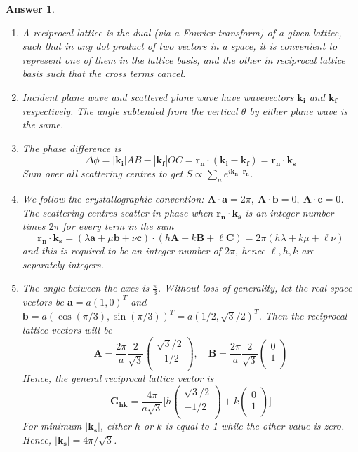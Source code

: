 \documentclass[a4paper]{article}
\newtheorem{ans}{Answer}[subsection]
\theoremstyle{new}
\begin{document}
\begin{ans}\leavevmode
\begin{enumerate}[label=(\roman*)]
\item A reciprocal lattice is the dual (via a Fourier transform) of a given lattice, such that in any dot product of two vectors in a space, it is convenient to represent one of them in the lattice basis, and the other in reciprocal lattice basis such that the cross terms cancel.
\item Incident plane wave and scattered plane wave have wavevectors $\mathbf{k_i}$ and $\mathbf{k_f}$ respectively. The angle subtended from the vertical $\theta$ by either plane wave is the same.
\item The phase difference is $$\Delta\phi=|\mathbf{k_i}|AB-|\mathbf{k_f}|OC=\mathbf{r_n}\cdot(\mathbf{k_i}-\mathbf{k_f})=\mathbf{r_n}\cdot\mathbf{k_s}$$
Sum over all scattering centres to get $S\propto \sum_ne^{i\mathbf{k_n}\cdot\mathbf{r_n}}$.
\item We follow the crystallographic convention: $\mathbf{A}\cdot\mathbf{a}=2\pi,~\mathbf{A}\cdot\mathbf{b}=0,~\mathbf{A}\cdot\mathbf{c}=0$. The scattering centres scatter in phase when $\mathbf{r_n}\cdot\mathbf{k_s}$ is an integer number times $2\pi$ for every term in the sum
$$\mathbf{r_n}\cdot\mathbf{k_s}=(\lambda\mathbf{a}+\mu\mathbf{b}+\nu\mathbf{c})\cdot(h\mathbf{A}+k\mathbf{B}+\ell\mathbf{C})=2\pi(h\lambda+k\mu+\ell\nu)$$
and this is required to be an integer number of $2\pi$, hence $\ell,h,k$ are separately integers.
\item The angle between the axes is $\frac{\pi}{3}$. Without loss of generality, let the real space vectors be $\mathbf{a}=a(1,0)^T$ and $\mathbf{b}=a(\cos(\pi/3),\sin(\pi/3))^T=a(1/2,\sqrt{3}/2)^T$. Then the reciprocal lattice vectors will be 
$$\mathbf{A}=\frac{2\pi}{a}\frac{2}{\sqrt{3}}\begin{pmatrix}\sqrt{3}/2\\-1/2\\\end{pmatrix},\quad \mathbf{B}=\frac{2\pi}{a}\frac{2}{\sqrt{3}}\begin{pmatrix}0\\1\\\end{pmatrix}$$
Hence, the general reciprocal lattice vector is
$$\mathbf{G_{hk}}=\frac{4\pi}{a\sqrt{3}}\bigg[h\begin{pmatrix}\sqrt{3}/2\\-1/2\\\end{pmatrix}+k\begin{pmatrix}0\\1\\\end{pmatrix}\bigg]$$
For minimum $|\mathbf{k_s}|$, either $h$ or $k$ is equal to 1 while the other value is zero. Hence, $|\mathbf{k_s}|=4\pi/\sqrt{3}$.
\end{enumerate}
\end{ans}
\newpage
\end{document}
